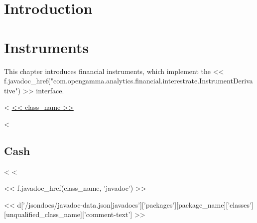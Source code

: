 \chapter{Introduction}

\chapter{Instruments}

This chapter introduces financial instruments, which implement the << f.javadoc_href("com.opengamma.analytics.financial.interestrate.InstrumentDerivative") >> interface.

<%
\hyperref[sec:<< class_name >>]{<< class_name >>}

<%

\section{Cash}
<%
\label{sec:<< class_name >>}
<%

<< f.javadoc_href(class_name, 'javadoc') >>

<< d['/jsondocs/javadoc-data.json|javadocs']['packages'][package_name]['classes'][unqualified_class_name]['comment-text'] >>

